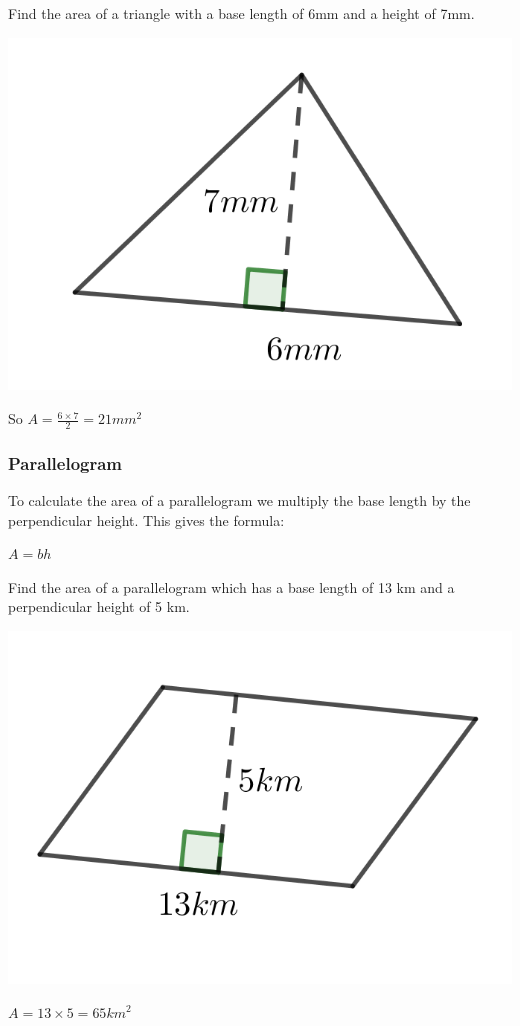 \begin{exmp}
	Find the area of a triangle with a base length of 6mm and a height of 7mm.

\bigskip

\includegraphics{./Images/Measurement/AreaEg2.png}

\bigskip

So $A = \frac{6 \times 7}{2} = 21 mm^2$
\end{exmp}
\subsubsection{Parallelogram}
To calculate the area of a parallelogram we multiply the base length by the perpendicular height.  This gives the formula:

\bigskip

$A=bh$

\begin{exmp}
	Find the area of a parallelogram which has a base length of 13 km and a perpendicular height of 5 km.

\bigskip

\includegraphics{./Images/Measurement/AreaEg3.png}

\bigskip

$A= 13 \times 5 = 65 km^2$
\end{exmp}

